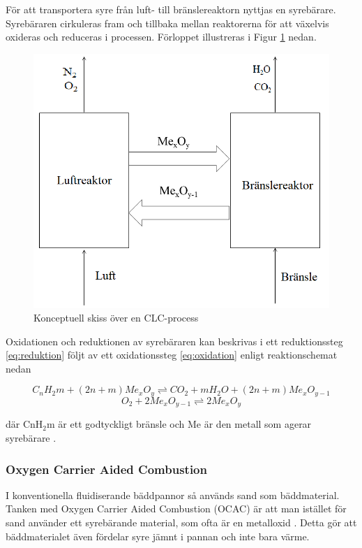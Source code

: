 För att transportera syre från luft- till bränslereaktorn nyttjas en syrebärare. Syrebäraren cirkuleras fram och tillbaka mellan reaktorerna för att växelvis oxideras och reduceras i processen. Förloppet illustreras i Figur \ref{fig:CLC} nedan.

\begin{figure}[H]
    \centering
    \includegraphics[scale=0.4]{CLC.png}
    \caption{Konceptuell skiss över en CLC-process}
    \label{fig:CLC}
\end{figure}

Oxidationen och reduktionen av syrebäraren kan beskrivas i ett reduktionssteg \eqref{eq:reduktion} följt av ett oxidationssteg \eqref{eq:oxidation} enligt reaktionschemat nedan

\begin{equation}
C_nH_2m+(2n+m)Me_xO_y \rightleftharpoons  CO_2+mH_2O+(2n+m)Me_xO_{y-1}
   \label{eq:reduktion}
\end{equation}
\begin{equation}
    O_2 + 2Me_xO_{y-1} \rightleftharpoons  2Me_xO_y
    \label{eq:oxidation}
\end{equation}

där CnH$_2$m är ett godtyckligt bränsle och Me är den metall som agerar syrebärare \cite{OresHenrik}.

\subsubsection{Oxygen Carrier Aided Combustion}
I konventionella fluidiserande bäddpannor så används sand som bäddmaterial. Tanken med Oxygen Carrier Aided Combustion (OCAC) är att man istället för sand använder ett syrebärande material, som ofta är en metalloxid \cite{doi:10.1021/acs.energyfuels.7b00197}. Detta gör att bäddmaterialet även fördelar syre jämnt i pannan och inte bara värme.

